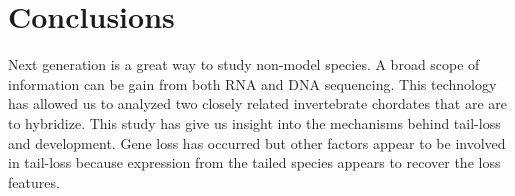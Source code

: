 \chapter{Conclusions}
Next generation is a great way to study non-model species. A broad scope of information can be gain from both RNA and DNA sequencing. This technology has allowed us to analyzed two closely related invertebrate chordates that are are to hybridize. This study has give us insight into the mechanisms behind tail-loss and development. Gene loss has occurred but other factors appear to be involved in tail-loss because expression from the tailed species appears to recover the loss features. 